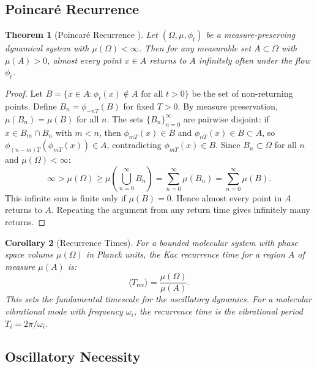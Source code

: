 \documentclass[11pt,a4paper]{article}
\newtheorem{theorem}{Theorem}[section]
\newtheorem{corollary}[theorem]{Corollary}
\theoremstyle{definition}
\theoremstyle{remark}
\begin{document}
\subsection{Poincar\'e Recurrence}

\begin{theorem}[Poincar\'e Recurrence {\citep{poincare1890}}]
\label{thm:poincare}
Let $(\Omega, \mu, \phi_t)$ be a measure-preserving dynamical system with $\mu(\Omega) < \infty$. Then for any measurable set $A \subset \Omega$ with $\mu(A) > 0$, almost every point $x \in A$ returns to $A$ infinitely often under the flow $\phi_t$.
\end{theorem}

\begin{proof}
Let $B = \{x \in A : \phi_t(x) \notin A \text{ for all } t > 0\}$ be the set of non-returning points. Define $B_n = \phi_{-nT}(B)$ for fixed $T > 0$. By measure preservation, $\mu(B_n) = \mu(B)$ for all $n$. The sets $\{B_n\}_{n=0}^\infty$ are pairwise disjoint: if $x \in B_m \cap B_n$ with $m < n$, then $\phi_{mT}(x) \in B$ and $\phi_{nT}(x) \in B \subset A$, so $\phi_{(n-m)T}(\phi_{mT}(x)) \in A$, contradicting $\phi_{mT}(x) \in B$. Since $B_n \subset \Omega$ for all $n$ and $\mu(\Omega) < \infty$:
\begin{equation}
\infty > \mu(\Omega) \geq \mu\left(\bigcup_{n=0}^\infty B_n\right) = \sum_{n=0}^\infty \mu(B_n) = \sum_{n=0}^\infty \mu(B).
\end{equation}
This infinite sum is finite only if $\mu(B) = 0$. Hence almost every point in $A$ returns to $A$. Repeating the argument from any return time gives infinitely many returns.
\end{proof}

\begin{corollary}[Recurrence Times]
\label{cor:recurrence_times}
For a bounded molecular system with phase space volume $\mu(\Omega)$ in Planck units, the Kac recurrence time \citep{kac1947} for a region $A$ of measure $\mu(A)$ is:
\begin{equation}
\langle T_{\mathrm{rec}} \rangle = \frac{\mu(\Omega)}{\mu(A)}.
\end{equation}
This sets the fundamental timescale for the oscillatory dynamics. For a molecular vibrational mode with frequency $\omega_i$, the recurrence time is the vibrational period $T_i = 2\pi/\omega_i$.
\end{corollary}

\subsection{Oscillatory Necessity}
\end{document}
